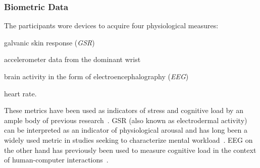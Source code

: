\documentclass[10pt,letterpaper]{article}
\providecommand{\DIFaddtex}[1]{#1} %
\providecommand{\DIFdeltex}[1]{} %
\providecommand{\DIFaddbegin}{\protect\color{blue}} %
\providecommand{\DIFaddend}{\protect\color{black}} %
\providecommand{\DIFdelbegin}{\protect\color{red}} %
\providecommand{\DIFdelend}{\protect\color{black}} %
\providecommand{\DIFadd}[1]{\texorpdfstring{\DIFaddtex{#1}}{#1}} %
\providecommand{\DIFdel}[1]{\texorpdfstring{\DIFdeltex{#1}}{}} %
\newcommand{\DIFscaledelfig}{0.5}
\newlength{\DIFdelgraphicswidth} %
\newlength{\DIFdelgraphicsheight} %
\newcommand{\DIFaddincludegraphics}[2][]{{\color{blue}\fbox{\DIFOincludegraphics[#1]{#2}}}} %
\newcommand{\DIFdelincludegraphics}[2][]{%
\sbox{\DIFdelgraphicsbox}{\DIFOincludegraphics[#1]{#2}}%
\settoboxwidth{\DIFdelgraphicswidth}{\DIFdelgraphicsbox} %
\settoboxtotalheight{\DIFdelgraphicsheight}{\DIFdelgraphicsbox} %
\scalebox{\DIFscaledelfig}{%
\parbox[b]{\DIFdelgraphicswidth}{\usebox{\DIFdelgraphicsbox}\\[-\baselineskip] \rule{\DIFdelgraphicswidth}{0em}}\llap{\resizebox{\DIFdelgraphicswidth}{\DIFdelgraphicsheight}{%
\setlength{\unitlength}{\DIFdelgraphicswidth}%
\begin{picture}(1,1)%
\thicklines\linethickness{2pt} %
{\color[rgb]{1,0,0}\put(0,0){\framebox(1,1){}}}%
{\color[rgb]{1,0,0}\put(0,0){\line( 1,1){1}}}%
{\color[rgb]{1,0,0}\put(0,1){\line(1,-1){1}}}%
\end{picture}%
}\hspace*{3pt}}} %
} %
\DeclareRobustCommand{\DIFaddbegin}{\DIFOaddbegin \let\includegraphics\DIFaddincludegraphics} %
\DeclareRobustCommand{\DIFaddend}{\DIFOaddend \let\includegraphics\DIFOincludegraphics} %
\DeclareRobustCommand{\DIFdelbegin}{\DIFOdelbegin \let\includegraphics\DIFdelincludegraphics} %
\DeclareRobustCommand{\DIFdelend}{\DIFOaddend \let\includegraphics\DIFOincludegraphics} %
\begin{document}
\subsubsection{Biometric Data}
The participants wore devices to acquire four physiological measures:
\DIFaddbegin \begin{enumerate*}[itemjoin={{, }},
                  itemjoin*={{, and }},
                  label={{(\arabic*)}}]
  \item galvanic skin response (\emph{GSR})
  \item accelerometer data from the dominant wrist
  \item brain activity in the form of electroencephalography (\emph{EEG})
  \item heart rate.
\end{enumerate*}
\DIFaddend 

\DIFdelbegin %

\DIFdelend These metrics have been used as indicators of stress and cognitive load by an ample body of previous research~\cite{khawadi2015:usinggsrtrust,kuikkaniemi2010:biofeedback,solovey2014:classifyingdriverworkload}.
\DIFdelbegin \DIFdel{More specifically, galvanic skin response (\emph{GSR}, }\DIFdelend \DIFaddbegin \DIFadd{GSR (}\DIFaddend also known as electrodermal activity) \DIFdelbegin \DIFdel{is the measure of the variation of the conductive properties of human skin due to changes in the state of the sweat glands.
It is }\DIFdelend \DIFaddbegin \DIFadd{can be }\DIFaddend interpreted as an indicator of physiological arousal and has long been a widely used metric in studies seeking to characterize mental workload~\cite{peterson1907psycho,Healey2005,Son2010,khawadi2015:usinggsrtrust,kuikkaniemi2010:biofeedback,solovey2014:classifyingdriverworkload,}.
\DIFdelbegin \DIFdel{Electroencephalography (\emph{EEG}) refers to the monitoring of brain activity through the measurement of the fluctuations of the electric field surrounding the brain.
\emph{EEG} measures the voltage fluctuations due to electrical activity within neurons in the brain, which result in distinct waves of specific frequencies associated with different contexts, emotions and actions.
\emph{EEG} has }\DIFdelend \DIFaddbegin \DIFadd{EEG on the other hand has previously }\DIFaddend been used to measure cognitive load in the context of human-computer interactions~\cite{Antonenko2010,Grimes2008,kumar2016measurement}.
\end{document}
